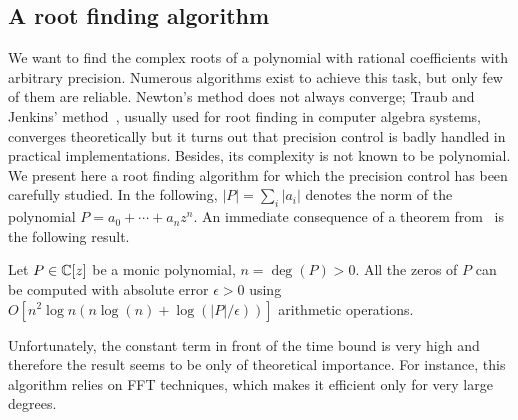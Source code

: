 \subsection{A root finding algorithm}
We want to find the complex roots of a polynomial with rational
coefficients with arbitrary precision. Numerous algorithms exist to achieve
this task, but only few of them are reliable. Newton's method does
not always converge; Traub and Jenkins' method~\cite{JeTr70}, usually
used for root finding in computer algebra systems, converges
theoretically but it turns out that
precision control is badly handled in practical implementations.
Besides, its complexity is not known to be polynomial. We 
present here a root finding algorithm for which the
precision control has been carefully studied. 
In the following,
$|P|=\sum_i |a_i|$ denotes the norm of the polynomial
$P=a_0+\cdots+a_n z^n$.
An immediate consequence of a theorem from~\cite{Pan87} is
the following result.
\begin{proposition}[Pan]\label{Pan}
Let $P \in {\Bbb C}[z]$ be a monic polynomial, $n=\deg(P)>0$. All the
zeros of $P$ can be computed with absolute error $\epsilon>0$
using $O\left[n^2 \log n (n \log(n) + \log(|P|/\epsilon)) \right]$
arithmetic operations.
\end{proposition}
Unfortunately, the constant term in front of the time bound is very high
and therefore the result seems to be only of theoretical importance.
For instance, this 
algorithm relies on FFT techniques, which makes it efficient only for very
large degrees.

